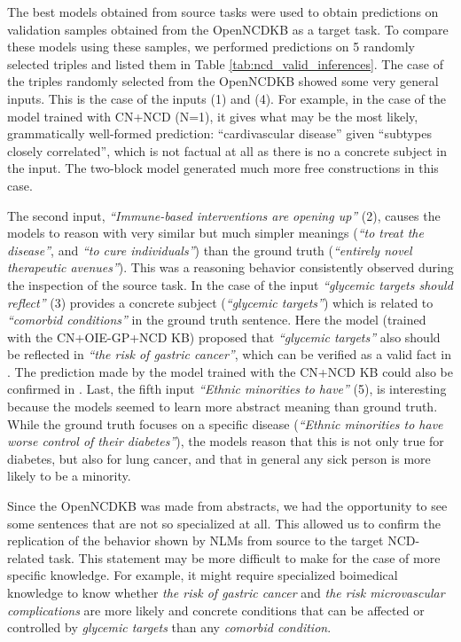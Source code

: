\documentclass[preprint]{elsarticle}
\begin{document}
The best models obtained from source tasks were used to obtain predictions on validation samples obtained from the OpenNCDKB as a target task. To compare these models using these samples, we performed predictions on 5 randomly selected triples and listed them in Table \ref{tab:ncd_valid_inferences}.
The case of the triples randomly selected from the OpenNCDKB showed some very general inputs. This is the case of the inputs (1) and (4). For example, in the case of the model trained with CN+NCD (N=1), it gives what may be the most likely, grammatically well-formed prediction: ``cardivascular disease'' given ``subtypes closely correlated'', which is not factual at all as there is no a concrete subject in the input. The two-block model generated much more free constructions in this case.

The second input, \textit{``Immune-based interventions are opening up''} (2), causes the models to reason with very similar but much simpler meanings (\textit{``to treat the disease''}, and \textit{``to cure individuals''}) than the ground truth (\textit{``entirely novel therapeutic avenues''}). This was a reasoning behavior consistently observed during the inspection of the source task.
In the case of the input \textit{``glycemic targets should reflect''} (3) provides a concrete subject (\textit{``glycemic targets''}) which is related to \textit{``comorbid conditions''} in the ground truth sentence. Here the model (trained with the CN+OIE-GP+NCD KB) proposed that \textit{``glycemic targets''} also should be reflected in \textit{``the risk of gastric cancer''}, which can be verified as a valid fact in \cite{augustin2004glycemic}. The prediction made by the model trained with the CN+NCD KB could also be confirmed in \cite{lachin2008effect}. Last, the fifth input \textit{``Ethnic minorities to have''} (5), is interesting because the models seemed to learn more abstract meaning than ground truth. While the ground truth focuses on a specific disease (\textit{``Ethnic minorities to have worse control of their diabetes''}), the models reason that this is not only true for diabetes, but also for lung cancer, and that in general any sick person is more likely to be a minority.

Since the OpenNCDKB was made from abstracts, we had the opportunity to see some sentences that are not so specialized at all. This allowed us to confirm the replication of the behavior shown by NLMs from source to the target NCD-related task. This statement may be more difficult to make for the case of more specific knowledge. For example, it might require specialized boimedical knowledge to know whether \textit{the risk of gastric cancer} and \textit{the risk microvascular complications} are more likely and concrete conditions that can be affected or controlled by \textit{glycemic targets} than any \textit{comorbid condition}. 
\end{document}

